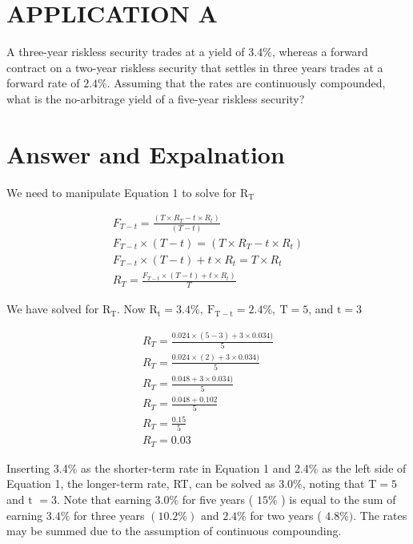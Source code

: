 \documentclass[11pt]{article}
\begin{document}
\section*{APPLICATION A}
A three-year riskless security trades at a yield of $3.4 \%$, whereas a forward contract on a two-year riskless security that settles in three years trades at a forward rate of $2.4 \%$. Assuming that the rates are continuously compounded, what is the no-arbitrage yield of a five-year riskless security?

\section*{Answer and Expalnation}
We need to manipulate Equation 1 to solve for $\mathrm{R}_{\mathrm{T}}$

$$
\begin{gathered}
F_{T-t}=\frac{\left(T \times R_{T}-t \times R_{t}\right)}{(T-t)} \\
F_{T-t} \times(T-t)=\left(T \times R_{T}-t \times R_{t}\right) \\
F_{T-t} \times(T-t)+t \times R_{t}=T \times R_{t} \\
R_{T}=\frac{\left.F_{T-t} \times(T-t)+t \times R_{t}\right)}{T}
\end{gathered}
$$

We have solved for $\mathrm{R}_{\mathrm{T}}$. Now $\mathrm{R}_{\mathrm{t}}=3.4 \%, \mathrm{~F}_{\mathrm{T}-\mathrm{t}}=2.4 \%, \mathrm{~T}=5$, and $\mathrm{t}=3$

$$
\begin{gathered}
R_{T}=\frac{0.024 \times(5-3)+3 \times 0.034)}{5} \\
R_{T}=\frac{0.024 \times(2)+3 \times 0.034)}{5} \\
R_{T}=\frac{0.048+3 \times 0.034)}{5} \\
R_{T}=\frac{0.048+0.102}{5} \\
R_{T}=\frac{0.15}{5} \\
R_{T}=0.03
\end{gathered}
$$

Inserting 3.4\% as the shorter-term rate in Equation 1 and 2.4\% as the left side of Equation 1, the longer-term rate, RT, can be solved as $3.0 \%$, noting that $\mathrm{T}=5$ and $\mathrm{t}$ $=3$. Note that earning $3.0 \%$ for five years ( $15 \%$ ) is equal to the sum of earning $3.4 \%$ for three years $(10.2 \%)$ and $2.4 \%$ for two years ( $4.8 \%)$. The rates may be summed due to the assumption of continuous compounding.
\end{document}
